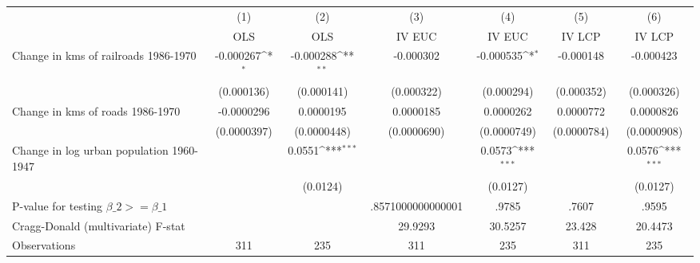 {
\def\sym#1{\ifmmode^{#1}\else\(^{#1}\)\fi}
\begin{tabular}{l*{6}{c}}
\hline\hline
                &\multicolumn{1}{c}{(1)}&\multicolumn{1}{c}{(2)}&\multicolumn{1}{c}{(3)}&\multicolumn{1}{c}{(4)}&\multicolumn{1}{c}{(5)}&\multicolumn{1}{c}{(6)}\\
                &\multicolumn{1}{c}{OLS}&\multicolumn{1}{c}{OLS}&\multicolumn{1}{c}{IV EUC}&\multicolumn{1}{c}{IV EUC}&\multicolumn{1}{c}{IV LCP}&\multicolumn{1}{c}{IV LCP}\\
\hline
Change in kms of railroads 1986-1970&-0.000267\sym{*}  &-0.000288\sym{**} &-0.000302         &-0.000535\sym{*}  &-0.000148         &-0.000423         \\
                &(0.000136)         &(0.000141)         &(0.000322)         &(0.000294)         &(0.000352)         &(0.000326)         \\
[1em]
Change in kms of roads 1986-1970&-0.0000296         &0.0000195         &0.0000185         &0.0000262         &0.0000772         &0.0000826         \\
                &(0.0000397)         &(0.0000448)         &(0.0000690)         &(0.0000749)         &(0.0000784)         &(0.0000908)         \\
[1em]
Change in log urban population 1960-1947&                  &   0.0551\sym{***}&                  &   0.0573\sym{***}&                  &   0.0576\sym{***}\\
                &                  & (0.0124)         &                  & (0.0127)         &                  & (0.0127)         \\
\hline
P-value for testing $\beta\_{2} >= \beta\_{1}$&                  &                  &.8571000000000001         &    .9785         &    .7607         &    .9595         \\
Cragg-Donald (multivariate) F-stat&                  &                  &  29.9293         &  30.5257         &   23.428         &  20.4473         \\
Observations    &      311         &      235         &      311         &      235         &      311         &      235         \\
\hline\hline
\end{tabular}
}
